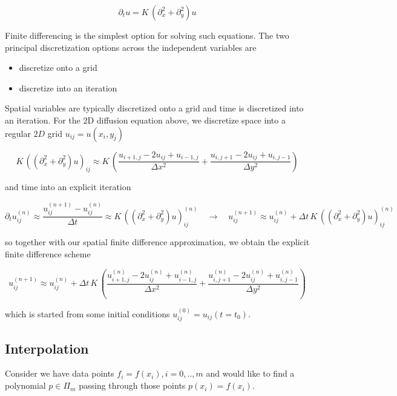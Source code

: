 \begin{equation}
    \partial_t u = K \, (\partial_x^2 + \partial_y^2) u
\end{equation}

Finite differencing is the simplest option for solving such equations. The two principal
discretization options across the independent variables are

\begin{itemize}
    \item discretize onto a grid
    \item discretize into an iteration
\end{itemize}

Spatial variables are typically discretized onto a grid and time is discretized into
an iteration. For the 2D diffusion equation above, we discretize space into a regular
$2D$ grid $u_{ij} = u(x_i,y_j)$ 

\begin{equation}
    K \, ((\partial_x^2 + \partial_y^2) u)_{ij} \approx K \, \left( \frac{u_{i+1,j} - 2 u_{ij} + u_{i-1,j}}{\Delta x^2} + \frac{u_{i,j+1} - 2 u_{ij} + u_{i,j-1}}{\Delta y^2} \right)
\end{equation}

and time into an explicit iteration

\begin{equation}
    \partial_t u_{ij}^{(n)} \approx \frac{u_{ij}^{(n+1)} - u_{ij}^{(n)}}{\Delta t} \approx K \, ((\partial_x^2 + \partial_y^2) u)_{ij}^{(n)} \quad \rightarrow \quad u_{ij}^{(n+1)} \approx u_{ij}^{(n)} + \Delta t \, K \, ((\partial_x^2 + \partial_y^2) u)_{ij}^{(n)}
\end{equation}

so together with our spatial finite difference approximation, we obtain the explicit finite difference scheme

\begin{equation}
    u_{ij}^{(n+1)} \approx u_{ij}^{(n)} + \Delta t \, K \, \left( \frac{u^{(n)}_{i+1,j} - 2 u^{(n)}_{ij} + u^{(n)}_{i-1,j}}{\Delta x^2} + \frac{u^{(n)}_{i,j+1} - 2 u^{(n)}_{ij} + u^{(n)}_{i,j-1}}{\Delta y^2} \right)
\end{equation}

which is started from some initial conditions $u_{ij}^{(0)} = u_{ij}(t = t_0)$.

\subsection{Interpolation}
Consider we have data points $f_i = f(x_i), i = 0,..,m$ and would like to 
find a polynomial $p \in \Pi_m$ passing through those points $p(x_i) = f(x_i)$.

